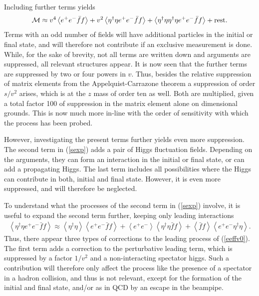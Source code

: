 \documentclass[final,twoside,12pt]{article}
\newcommand*{\no}{\noindent}
\newcommand*{\bea}{\begin{eqnarray}}
\newcommand*{\eea}{\end{eqnarray}}
\newcommand*{\be}{\begin{equation}}
\newcommand*{\ee}{\end{equation}}
\newcommand*{\pref}[1]{(\ref{#1})}
\newcommand*{\1}{1\!\!\!\bot}
\newcommand*{\la}{\left\langle}
\newcommand*{\ra}{\right\rangle}
\begin{document}
Including further terms yields \cite{Egger:2017tkd}
\be
{\cal M}\approx v^4\la e^+e^-\bar{f}f\ra+v^2\la\eta^\dagger\eta e^+e^-\bar{f}f\ra+\la\eta^\dagger\eta\eta^\dagger\eta e^+e^-\bar{f}f\ra + \text{rest}\label{sexp}.
\ee
\no Terms with an odd number of fields will have additional particles in the initial or final state, and will therefore not contribute if an exclusive measurement is done. While, for the sake of brevity, not all terms are written down and arguments are suppressed, all relevant structures appear. It is now seen that the further terms are suppressed by two or four powers in $v$. Thus, besides the relative suppression of matrix elements from the Appelquist-Carrazone theorem a suppression of order $s/v^2$ arises, which is at the $z$ mass of order ten as well. Both are multiplied, given a total factor 100 of suppression in the matrix element alone on dimensional grounds. This is now much more in-line with the order of sensitivity with which the process has been probed.

However, investigating the present terms further yields even more suppression. The second term in \pref{sexp} adds a pair of Higgs fluctuation fields. Depending on the arguments, they can form an interaction in the initial or final state, or can add a propagating Higgs. The last term includes all possibilities where the Higgs can contribute in both, initial and final state. However, it is even more suppressed, and will therefore be neglected.

To understand what the processes of the second term in \pref{sexp} involve, it is useful to expand the second term further, keeping only leading interactions \cite{Egger:2017tkd}
\bea
\la\eta^\dagger\eta e^+e^-\bar{f}f\ra\approx\la\eta^\dagger\eta\ra\la e^+e^-\bar{f}f\ra  +  \la e^+e^-\ra\la\eta^\dagger\eta\bar{f}f\ra+  \la\bar{f}f\ra\la e^+e^-\eta^\dagger\eta\ra\label{sexp2}.
\eea
\no Thus, there appear three types of corrections to the leading process of \pref{eeffv0}. The first term adds a correction to the perturbative leading term, which is suppressed by a factor $1/v^2$ and a non-interacting spectator higgs. Such a contribution will therefore only affect the process like the presence of a spectator in a hadron collision, and thus is not relevant, except for the formation of the initial and final state, and/or as in QCD by an escape in the beampipe.
\end{document}
